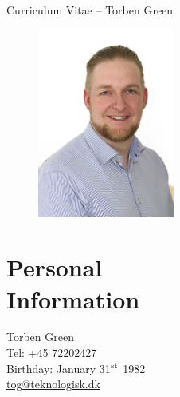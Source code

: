 \documentclass[margin,line,a4paper]{resume}
\begin{document}
{\sc \Large Curriculum Vitae -- Torben Green}
\begin{resume}
    \vspace{0.5cm}
    \begin{figure}
      \vspace{-1cm}
      \begin{center}
        \includegraphics[width=0.4\textwidth]{TOG_visitkort}
      \end{center}
      \vspace{-1cm}
    \end{figure}

    \section{\mysidestyle Personal\\Information}%
    Torben Green \\
    Tel: +45 72202427 \\
    Birthday: January 31$^{\rm st}$ 1982\\
    \href{mailto:tog@teknologisk.dk}{tog@teknologisk.dk}


\end{resume}
\end{document}
